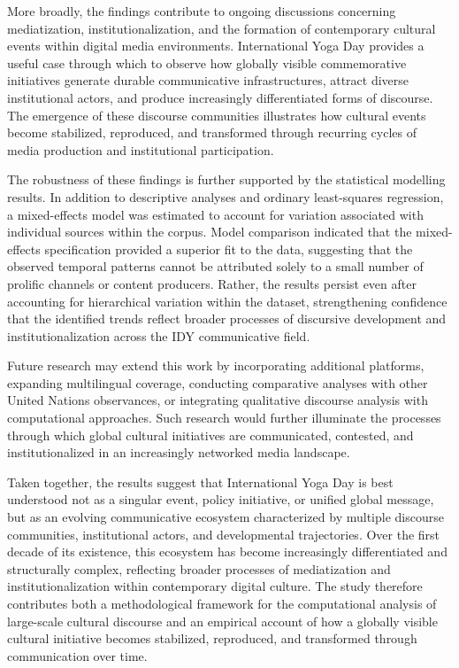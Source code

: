 \documentclass[11pt]{article}
\begin{document}
More broadly, the findings contribute to ongoing discussions concerning mediatization, institutionalization, and the
formation of contemporary cultural events within digital media environments. International Yoga Day provides a useful
case through which to observe how globally visible commemorative initiatives generate durable communicative
infrastructures, attract diverse institutional actors, and produce increasingly differentiated forms of discourse. The
emergence of these discourse communities illustrates how cultural events become stabilized, reproduced, and transformed
through recurring cycles of media production and institutional participation.


The robustness of these findings is further supported by the statistical modelling results. In addition to descriptive
analyses and ordinary least-squares regression, a mixed-effects model was estimated to account for variation associated
with individual sources within the corpus. Model comparison indicated that the mixed-effects specification provided a
superior fit to the data, suggesting that the observed temporal patterns cannot be attributed solely to a small number
of prolific channels or content producers. Rather, the results persist even after accounting for hierarchical variation
within the dataset, strengthening confidence that the identified trends reflect broader processes of discursive
development and institutionalization across the IDY communicative field.


Future research may extend this work by incorporating additional platforms, expanding multilingual coverage, conducting
comparative analyses with other United Nations observances, or integrating qualitative discourse analysis with
computational approaches. Such research would further illuminate the processes through which global cultural initiatives
are communicated, contested, and institutionalized in an increasingly networked media landscape.


Taken together, the results suggest that International Yoga Day is best understood not as a singular event, policy
initiative, or unified global message, but as an evolving communicative ecosystem characterized by multiple discourse
communities, institutional actors, and developmental trajectories. Over the first decade of its existence, this
ecosystem has become increasingly differentiated and structurally complex, reflecting broader processes of mediatization
and institutionalization within contemporary digital culture. The study therefore contributes both a methodological
framework for the computational analysis of large-scale cultural discourse and an empirical account of how a globally
visible cultural initiative becomes stabilized, reproduced, and transformed through communication over time.
\end{document}
